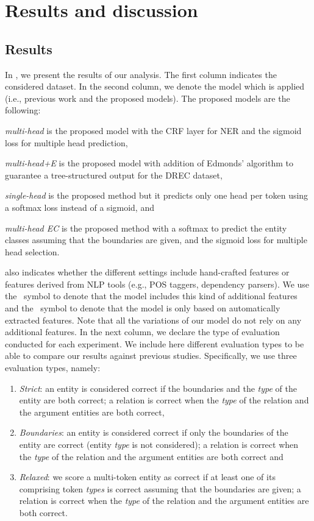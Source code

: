 \documentclass[review]{elsarticle}
\newcommand{\cmark}{\ding{51}}\newcommand{\xmark}{\ding{55}}
\newcommand{\eg}{e.g., }
\newcommand{\ie}{i.e., }
\begin{document}
\section{Results and discussion}
\label{sec:results}
\subsection{Results}

\noindent In , we present the results of our analysis. The first column indicates the considered dataset. In the second column, we denote the model which is applied (\ie previous work and the proposed models). The proposed models are the following:
\begin{enumerate*}[label=(\roman*)]
\item \emph{multi-head} is the proposed model with the CRF layer for NER and the sigmoid loss for multiple head prediction,
\item \emph{multi-head+E} is the proposed model with addition of Edmonds' algorithm to guarantee a tree-structured output for the DREC dataset,
\item \emph{single-head} is the proposed method but it predicts only one head per token using a softmax loss instead of a sigmoid, and
\item \emph{multi-head EC} is the proposed method with a softmax to predict the entity classes assuming that the boundaries are given, and the sigmoid loss for multiple head selection.
\end{enumerate*}
 also indicates whether the different settings include hand-crafted features or features derived from NLP tools (\eg POS taggers, dependency parsers). We use the \cmark~symbol to denote that the model includes this kind of additional features and the \xmark~symbol to denote that the model is only based on automatically extracted features. Note that all the variations of our model do not rely on any additional features.
In the next column, we declare the type of evaluation conducted for each experiment. We include here different evaluation types to be able to compare our results against previous studies. Specifically, we use three evaluation types, namely: 
\begin{enumerate}[label=(\roman*)]
\item \emph{Strict}: an entity is considered correct if the boundaries and the \emph{type} of the entity are both correct; a relation is correct when the \emph{type} of the relation and the argument entities are both correct,
\item \emph{Boundaries}: an entity is considered correct if only the boundaries of the entity are correct (entity \emph{type} is not considered); a relation is correct when the \emph{type} of the relation and the argument entities are both correct and
\item \emph{Relaxed}: we score a multi-token entity as correct if
at least one of its comprising token \emph{types} is correct assuming that the boundaries are given; a relation is correct when the \emph{type} of the relation and the argument entities are both correct.
\end{enumerate}
\end{document}
